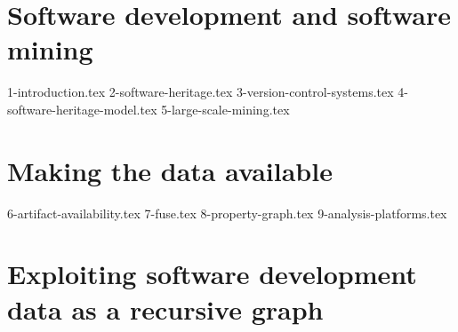 \documentclass[a4paper,11pt,openbib,draft]{memoir}
\begin{document}
\raggedbottom

\frontmatter
{}
%

\clearemptydoublepage

%

\clearemptydoublepage
%

\clearemptydoublepage
%


\renewcommand{\contentsname}{Table of Contents}
\tableofcontents*
{}
%

\iffalse
\listoftables
\addtocontents{lot}{\par\nobreak\textbf{{\scshape Table} \hfill Page}\par\nobreak}
\clearemptydoublepage
\listoffigures
\addtocontents{lof}{\par\nobreak\textbf{{\scshape Figure} \hfill Page}\par\nobreak}
\clearemptydoublepage
\fi
%
%
\mainmatter
%


\part{Software development and software mining}

{1-introduction.tex}
{2-software-heritage.tex}
{3-version-control-systems.tex}
{4-software-heritage-model.tex}
{5-large-scale-mining.tex}

\part{Making the data available}

{6-artifact-availability.tex}
{7-fuse.tex}
\iffalse
{8-property-graph.tex}
{9-analysis-platforms.tex}

\part{Exploiting software development data as a recursive graph}
\end{document}
